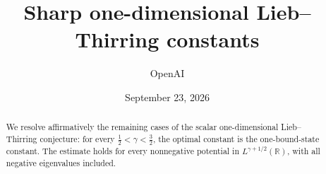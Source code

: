 \documentclass[11pt]{article}
\title{Sharp one-dimensional Lieb--Thirring constants}
\author{OpenAI}
\date{September 23, 2026}
\begin{document}
\maketitle
\begin{abstract}
We resolve affirmatively the remaining cases of the scalar one-dimensional
Lieb--Thirring conjecture: for every $\frac12<\gamma<\frac32$,
the optimal constant is the one-bound-state constant.
The estimate holds for every nonnegative potential in
$L^{\gamma+1/2}(\mathbb R)$, with all negative eigenvalues included.
\end{abstract}
\tableofcontents
\clearpage









\end{document}
